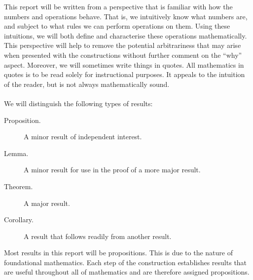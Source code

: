 \documentclass[../main.tex]{subfiles}
\begin{document}
This report will be written from a perspective that is familiar with how the numbers and operations behave. That is, we intuitively know what numbers are, and subject to what rules we can perform operations on them. Using these intuitions, we will both define and characterise these operations mathematically. This perspective will help to remove the potential arbitrariness that may arise when presented with the constructions without further comment on the ``why'' aspect. Moreover, we will sometimes write things in quotes. All mathematics in quotes is to be read solely for instructional purposes. It appeals to the intuition of the reader, but is not always mathematically sound. \\\\
We will distinguish the following types of results:
\begin{description}
    \item[Proposition.] A minor result of independent interest.
    \item[Lemma.] A minor result for use in the proof of a more major result.
    \item[Theorem.] A major result.
    \item[Corollary.] A result that follows readily from another result.
\end{description}
Most results in this report will be propositions. This is due to the nature of foundational mathematics. Each step of the construction establishes results that are useful throughout all of mathematics and are therefore assigned propositions.
\end{document}
